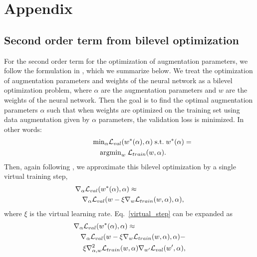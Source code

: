 \appendix

\section{Appendix}
\subsection{Second order term from bilevel optimization}
\label{second_order_explained}
For the second order term for the optimization of augmentation parameters, we follow the formulation in  \cite{liu2018darts}, which we summarize below. We treat the optimization of augmentation parameters and weights of the neural network as a bilevel optimization problem, where $\alpha$ are the augmentation parameters and $w$ are the weights of the neural network. Then the goal is to find the optimal augmentation parameters $\alpha$ such that when weights are optimized on the training set using data augmentation given by $\alpha$ parameters, the validation loss is minimized. In other words:
\begin{eqnarray}
    \lefteqn{\mathrm{min}_{\alpha} \mathcal{L}_{val}(w^*(\alpha),\alpha) \; \mathrm{s.t.} \; w^*(\alpha) =} \nonumber \\ &&\mathrm{argmin}_w \;\mathcal{L}_{train}(w,\alpha).
\end{eqnarray}
Then, again following \cite{liu2018darts}, we approximate this bilevel optimization by a single virtual training step,
\begin{eqnarray}
\lefteqn{\nabla_{\alpha} \mathcal{L}_{val} ( w^*(\alpha),\alpha) \approx} \nonumber \\ &&\nabla_{\alpha} \mathcal{L}_{val} ( w - \xi \nabla_w \mathcal{L}_{train} (w,\alpha), \alpha),
\label{virtual_step}
\end{eqnarray}
where $\xi$ is the virtual learning rate. Eq.~\ref{virtual_step} can be expanded as
\begin{eqnarray}
\lefteqn{\nabla_{\alpha} \mathcal{L}_{val} ( w^*(\alpha),\alpha) \approx}\nonumber \\&&\nabla_{\alpha} \mathcal{L}_{val} ( w - \xi \nabla_w \mathcal{L}_{train} (w,\alpha), \alpha)- \nonumber \\ &&\xi \nabla^2_{\alpha,w} \mathcal{L}_{train} ( w, \alpha) \nabla_{w'}\mathcal{L}_{val}(w',\alpha),
\label{chain_rule}
\end{eqnarray}


